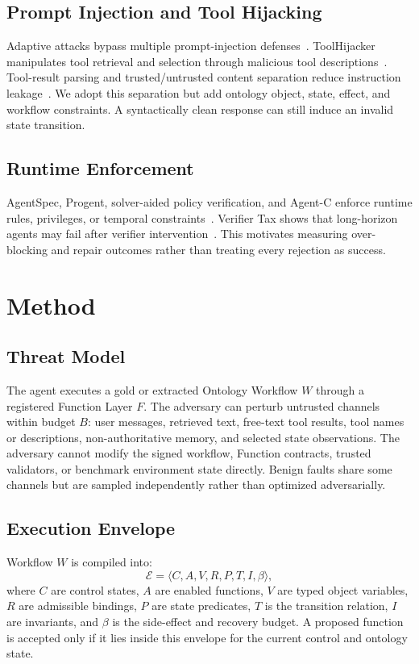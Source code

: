 \documentclass[10pt,twocolumn]{article}
\begin{document}
\subsection{Prompt Injection and Tool Hijacking}
Adaptive attacks bypass multiple prompt-injection defenses~\cite{zhan2025adaptive}. ToolHijacker manipulates tool retrieval and selection through malicious tool descriptions~\cite{shi2025toolhijacker}. Tool-result parsing and trusted/untrusted content separation reduce instruction leakage~\cite{beurerkellner2025patterns,yu2026toolparsing}. We adopt this separation but add ontology object, state, effect, and workflow constraints. A syntactically clean response can still induce an invalid state transition.

\subsection{Runtime Enforcement}
AgentSpec, Progent, solver-aided policy verification, and Agent-C enforce runtime rules, privileges, or temporal constraints~\cite{wang2025agentspec,shi2025progent,winston2026solver,kamath2025agentc}. Verifier Tax shows that long-horizon agents may fail after verifier intervention~\cite{sah2026verifiertax}. This motivates measuring over-blocking and repair outcomes rather than treating every rejection as success.

\section{Method}
\subsection{Threat Model}
The agent executes a gold or extracted Ontology Workflow $W$ through a registered Function Layer $F$. The adversary can perturb untrusted channels within budget $B$: user messages, retrieved text, free-text tool results, tool names or descriptions, non-authoritative memory, and selected state observations. The adversary cannot modify the signed workflow, Function contracts, trusted validators, or benchmark environment state directly. Benign faults share some channels but are sampled independently rather than optimized adversarially.

\subsection{Execution Envelope}
Workflow $W$ is compiled into:
\[
\mathcal{E}=\langle C,A,V,R,P,T,I,\beta\rangle,
\]
where $C$ are control states, $A$ are enabled functions, $V$ are typed object variables, $R$ are admissible bindings, $P$ are state predicates, $T$ is the transition relation, $I$ are invariants, and $\beta$ is the side-effect and recovery budget. A proposed function is accepted only if it lies inside this envelope for the current control and ontology state.
\end{document}
